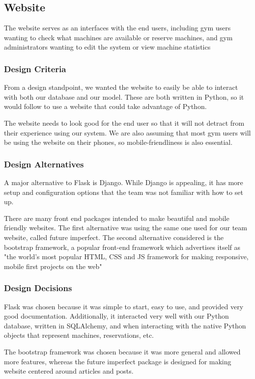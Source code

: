 \documentclass[PPFS.tex]{template/subfiles}
\begin{document}
\subsection{Website}
The website serves as an interfaces with the end users, including gym users wanting to check what machines are available or reserve machines, and gym administrators wanting to edit the system or view machine statistics 

\subsubsection{Design Criteria}
From a design standpoint, we wanted the website to easily be able to interact with both our database and our model. These are both written in Python, so it would follow to use a website that could take advantage of Python.

The website needs to look good for the end user so that it will not detract from their experience using our system. We are also assuming that most gym users will be using the website on their phones, so mobile-friendliness is also essential.

\subsubsection{Design Alternatives}
A major alternative to Flask is Django. While Django is appealing, it has more setup and configuration options that the team was not familiar with how to set up.

There are many front end packages intended to make beautiful and mobile friendly websites. The first alternative was using the same one used for our team website, called future imperfect.
The second alternative considered is the bootstrap framework, a popular front-end framework which advertises itself as "the world's most popular HTML, CSS and JS framework for making responsive, mobile first projects on the web"

\subsubsection{Design Decisions}
Flask was chosen because it was simple to start, easy to use, and provided very good documentation. Additionally, it interacted very well with our Python database, written in SQLAlchemy, and when interacting with the native Python objects that represent machines, reservations, etc.

The bootstrap framework was chosen because it was more general and allowed more features, whereas the future imperfect package is designed for making website centered around articles and posts.
\end{document}
